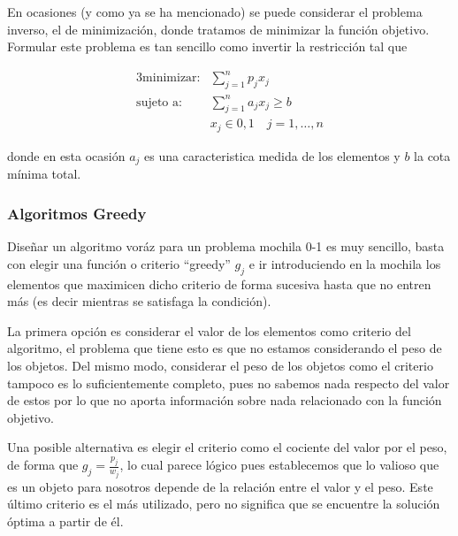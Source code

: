 En ocasiones (y como ya se ha mencionado) se puede considerar el problema inverso, el de minimización, donde tratamos de 
minimizar la función objetivo. Formular este problema es tan sencillo como invertir la restricción tal que

\begin{alignat}{3}
    \text{minimizar:}   &   \sum_{j=1}^n p_jx_j       \\
    \text{sujeto a:}    &   \sum_{j=1}^n a_jx_j\geq b \\
                        &   x_j \in {0, 1} \quad j=1,\dots,n
\end{alignat}

\noindent donde en esta ocasión $a_j$ es una caracteristica medida de los elementos y $b$ la cota mínima total.

\newpage

\subsubsection{Algoritmos Greedy}

Diseñar un algoritmo voráz para un problema mochila 0-1 es muy sencillo, basta con elegir una función o criterio ``greedy''
$g_j$ e ir introduciendo en la mochila los elementos que maximicen dicho criterio de forma sucesiva hasta que no entren
más (es decir mientras se satisfaga la condición). 

\vspace*{2mm}

La primera opción es considerar el valor de los elementos como criterio del algoritmo, el problema que tiene esto es que no 
estamos considerando el peso de los objetos. Del mismo modo, considerar el peso de los objetos como el criterio tampoco es lo 
suficientemente completo, pues no sabemos nada respecto del valor de estos por lo que no aporta información sobre nada 
relacionado con la función objetivo. 

Una posible alternativa es elegir el criterio como el cociente del valor por el peso, de forma que $g_j=\frac{p_j}{w_j}$,
lo cual parece lógico pues establecemos que lo valioso que es un objeto para nosotros depende de la relación entre el valor
y el peso. Este último criterio es el más utilizado, pero no significa que se encuentre la solución óptima a partir de él.

\vspace*{2mm}

